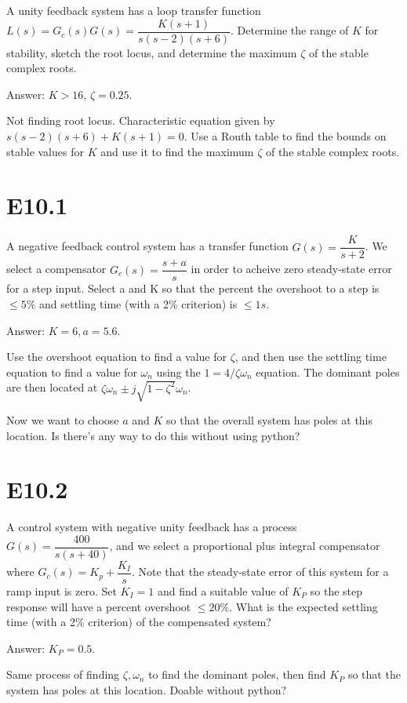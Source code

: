 \documentclass[11pt]{article}
\begin{document}
A unity feedback system has a loop transfer function $L(s) = G_c(s) G(s) = \dfrac{K(s + 1)}{s(s - 2)(s + 6)}$. Determine the range of $K$ for stability, sketch the root locus, and determine the maximum $\zeta$ of the stable complex roots. 

Answer: $K > 16$, $\zeta = 0.25$.

Not finding root locus. Characteristic equation given by $s(s - 2)(s + 6) + K(s + 1) = 0$. Use a Routh table to find the bounds on stable values for $K$ and use it to find the maximum $\zeta$ of the stable complex roots.

\section{E10.1}

A negative feedback control system has a transfer function $G(s) = \dfrac{K}{s + 2}$. We select a compensator $G_c(s) = \dfrac{s + a}{s}$ in order to acheive zero steady-state error for a step input. Select a and K so that the percent the overshoot to a step is $\leq 5\%$ and settling time (with a 2\% criterion) is $\leq 1s$.

Answer: $K = 6, a = 5.6$.

Use the overshoot equation to find a value for $\zeta$, and then use the settling time equation to find a value for $\omega_n$ using the $1 = 4 / \zeta \omega_n$ equation. The dominant poles are then located at $\zeta \omega_n \pm j \sqrt{1 - \zeta^2} \omega_n$. 

Now we want to choose $a$ and $K$ so that the overall system has poles at this location. Is there's any way to do this without using python?

\section{E10.2}

A control system with negative unity feedback has a process $G(s) = \dfrac{400}{s(s + 40)}$, and we select a proportional plus integral compensator where $G_c(s) = K_p + \dfrac{K_I}{s}$. Note that the steady-state error of this system for a ramp input is zero. Set $K_I = 1$ and find a suitable value of $K_P$ so the step response will have a percent overshoot $\leq 20\%$. What is the expected settling time (with a 2\% criterion) of the compensated system?

Answer: $K_P = 0.5$.

Same process of finding $\zeta, \omega_n$ to find the dominant poles, then find $K_P$ so that the system has poles at this location. Doable without python?
\end{document}
